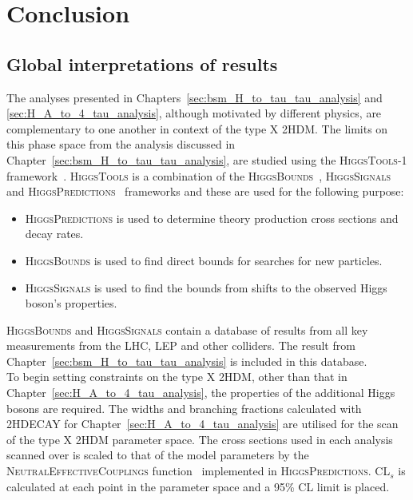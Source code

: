 \chapter{Conclusion}
\label{sec:conclusion}

\section{Global interpretations of results}

The analyses presented in Chapters~\ref{sec:bsm_H_to_tau_tau_analysis} and \ref{sec:H_A_to_4_tau_analysis}, although motivated by different physics, are complementary to one another in context of the type X \ac{2HDM}.
The limits on this phase space from the analysis discussed in Chapter~\ref{sec:bsm_H_to_tau_tau_analysis}, are studied using the \textsc{HiggsTools-1} framework~\cite{Bahl:2022igd}.
\textsc{HiggsTools} is a combination of the \textsc{HiggsBounds}~\cite{Bechtle:2020pkv}, \textsc{HiggsSignals}~\cite{Bechtle:2020uwn} and \textsc{HiggsPredictions}~\cite{Bahl:2022igd} frameworks and these are used for the following purpose:

\begin{itemize}
\item \textsc{HiggsPredictions} is used to determine theory production cross sections and decay rates.
\item \textsc{HiggsBounds} is used to find direct bounds for searches for new particles.
\item \textsc{HiggsSignals} is used to find the bounds from shifts to the observed Higgs boson's properties.
\end{itemize}

\textsc{HiggsBounds} and \textsc{HiggsSignals} contain a database of results from all key measurements from the \ac{LHC}, \ac{LEP} and other colliders.
The result from Chapter~\ref{sec:bsm_H_to_tau_tau_analysis} is included in this database. \\

To begin setting constraints on the type X \ac{2HDM}, other than that in Chapter~\ref{sec:H_A_to_4_tau_analysis}, the properties of the additional Higgs bosons are required.
The widths and branching fractions calculated with \textsc{2HDECAY} for Chapter~\ref{sec:H_A_to_4_tau_analysis} are utilised for the scan of the type X 2HDM parameter space.
The cross sections used in each analysis scanned over is scaled to that of the model parameters by the \textsc{NeutralEffectiveCouplings} function~\cite{Bechtle:2020pkv} implemented in \textsc{HiggsPredictions}.
CL$_s$ is calculated at each point in the parameter space and a 95\% \ac{CL} limit is placed. \\

